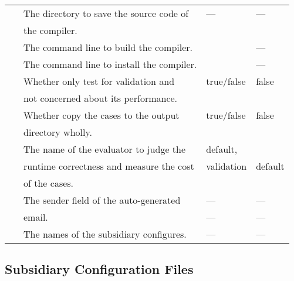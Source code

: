 \documentclass[a4paper]{article}
\begin{document}
\begin{table}[thbp]
\begin{tabular}{||c|l|l|l||}
                    \hline\hline
                    \verb\COMPILER\    &   The directory to save the source code of & --- & --- \\
                                       &   the compiler. & & \\
                    \hline
                    \verb\BUILD\       &   The command line to build the compiler. & \verb\make all -f Make.native\ & ---  \\
                    \hline
                    \verb\INSTALL\     &   The command line to install the compiler. & \verb\./INSTALL.native\ & --- \\
                    \hline\
                    \verb\VALIDATION_ONLY\ & Whether only test for validation and & true/false & false \\
                                        &  not concerned about its performance.   &            &        \\
                    \hline
                    \verb\WHOLE_COPY\   & Whether copy the cases to the output    & true/false & false \\
                                        & directory wholly.                        &            &       \\
                    \hline
                    \verb\EVALUATOR\   &  The name of the evaluator to judge the  & default,    &   \\
                                       &  runtime correctness and measure the cost & validation & default \\
                                       &  of the cases.                           &             &         \\
                    \hline
                    \verb\MAIL_SENDER\ &  The sender field of the auto-generated & --- & --- \\
                                       &  email.                                 & --- & --- \\
                    \hline
                    \verb\SUBCONF\     &  The names of the subsidiary configures. & --- & --- \\
                    \hline\hline
                \end{tabular}

            \end{table}

        \subsection{Subsidiary Configuration Files}
\end{document}

